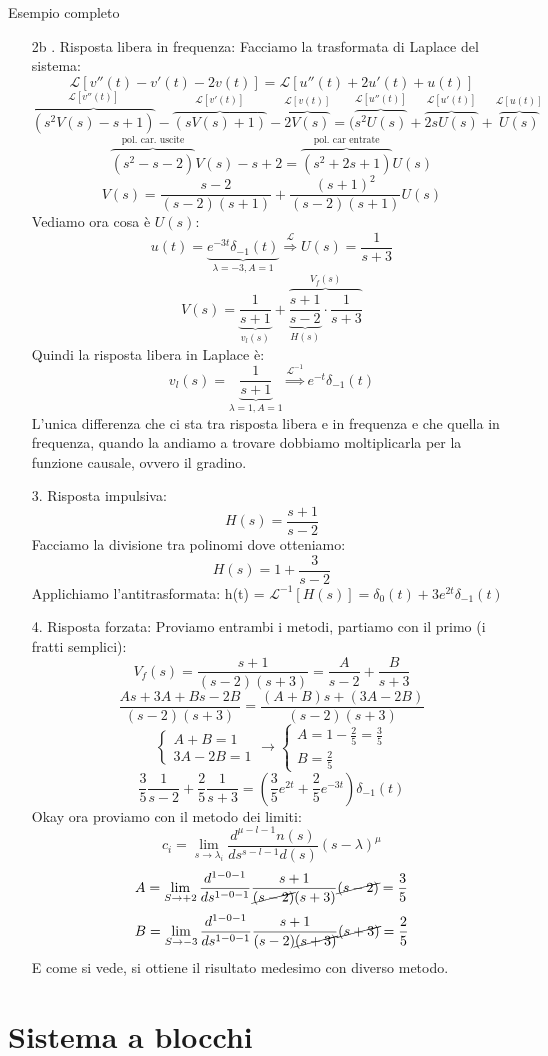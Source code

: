 \documentclass[a4paper]{article}
\begin{document}
\begin{examplebox}{Esempio completo}
\begin{enumerate}
        \item[2b .] Risposta libera in frequenza:
        Facciamo la trasformata di Laplace del sistema:
         \[\mathcal{L}[v''(t) - v'(t) - 2v(t)] = \mathcal{L}[u''(t) + 2u'(t) + u(t)]\]
            \[\overbrace{(s^2V(s) - s + 1)}^{\mathcal{L}[v''(t)]} - \overbrace{(sV(s) + 1)}^{\mathcal{L}[v'(t)]} - \overbrace{2V(s)}^{\mathcal{L}[v(t)]} = (\overbrace{s^2U(s)}^{\mathcal{L}[u''(t)]} + \overbrace{2sU(s)}^{\mathcal{L}[u'(t)]} + \overbrace{U(s)}^{\mathcal{L}[u(t)]}\]
        \[\overbrace{(s^2 - s - 2)}^{\text{pol. car. uscite}}V(s) - s + 2 = \overbrace{(s^2 + 2s + 1)}^{\text{pol. car entrate}}U(s)\]
        \[V(s) = \frac{s - 2}{(s-2)(s+1)} + \frac{(s+1)^2}{(s-2)(s+1)} U(s)\]
        Vediamo ora cosa è $U(s)$:
        \[u(t) = \underbrace{e^{-3t}\delta_{-1}(t)}_{\lambda = -3, A = 1} \stackrel{\mathcal{L}}{\Longrightarrow} U(s) = \frac{1}{s+3}\]
        \[V(s) = \underbrace{\frac{1}{s+1}}_{v_l(s)} + \overbrace{\underbrace{\frac{s+1}{s-2}}_{H(s)} \cdot \frac{1}{s+3}}^{V_f(s)}\]
        Quindi la risposta libera in Laplace è: 
        \[v_l(s) = \underbrace{\frac{1}{s+1}}_{\lambda = 1, A = 1}\stackrel{\mathcal{L}^{-1}}{\Longrightarrow} e^{-t}\delta_{-1}(t)\]
        L'unica differenza che ci sta tra risposta libera e in frequenza e che quella in frequenza, quando la andiamo a trovare
        dobbiamo moltiplicarla per la funzione causale, ovvero il gradino.
        \item[3. ] Risposta impulsiva:
        \[H(s) = \frac{s+1}{s-2}\]
        Facciamo la divisione tra polinomi dove otteniamo:
        \[H(s) = 1 + \frac{3}{s-2}\]
        Applichiamo l'antitrasformata:
        h(t) = $\mathcal{L}^{-1}[H(s)] = \delta_0(t) + 3e^{2t}\delta_{-1}(t)$
        \item[4. ] Risposta forzata: Proviamo entrambi i metodi, partiamo con il primo (i fratti semplici):
        \[V_f(s) = \frac{s+1}{(s-2)(s+3)} = \frac{A}{s-2} + \frac{B}{s+3}\]
        \[\frac{As + 3A + Bs - 2B}{(s-2)(s+3)} = \frac{(A+B)s + (3A - 2B)}{(s-2)(s+3)}\]
        \[\begin{cases}
            A + B = 1\\
            3A - 2B = 1
        \end{cases} \rightarrow \begin{cases}
            A = 1 - \frac{2}{5} = \frac{3}{5}\\
            B = \frac{2}{5}
        \end{cases}\]
        \[\frac{3}{5}\frac{1}{s-2} + \frac{2}{5} \frac{1}{s+3} = \left(\frac{3}{5}e^{2t} + \frac{2}{5}e^{-3t}\right)\delta_{-1}(t)\]
        Okay ora proviamo con il metodo dei limiti:
        \[c_{i} = \lim_{s \rightarrow \lambda_i}\frac{d^{\mu - l - 1}n(s)}{ds^{s-l-1}d(s)}(s-\lambda)^\mu\]
        \[A = \lim_{S \rightarrow +2} \frac{d^{1-0-1}}{ds^{1-0-1}} \frac{s+1}{\cancel{(s-2)}(s+3)}\cancel{(s-2)} = \frac{3}{5}\]
        \[B =\lim_{S \rightarrow -3} \frac{d^{1-0-1}}{ds^{1-0-1}} \frac{s+1}{(s-2)\cancel{(s+3)}}\cancel{(s+3)} = \frac{2}{5} \]
        E come si vede, si ottiene il risultato medesimo con diverso metodo.
    \end{enumerate}
\end{examplebox}
\noindent

\section{Sistema a blocchi}
\end{document}
